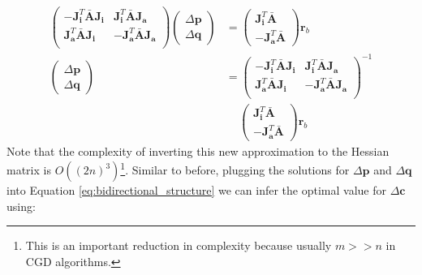\begin{equation}
    \begin{aligned}
        \begin{pmatrix}
            -\mathbf{J}_{\mathbf{i}}^T \bar{\mathbf{A}}\mathbf{J}_{\mathbf{i}} & \mathbf{J}_{\mathbf{i}}^T \bar{\mathbf{A}}\mathbf{J}_{\mathbf{a}}
            \\
            \mathbf{J}_{\mathbf{a}}^T \bar{\mathbf{A}}\mathbf{J}_{\mathbf{i}} & -\mathbf{J}_{\mathbf{a}}^T \bar{\mathbf{A}}\mathbf{J}_{\mathbf{a}}
            \\
        \end{pmatrix}
        \begin{pmatrix}
            \Delta\mathbf{p}
            \\
            \Delta\mathbf{q}
        \end{pmatrix} & =
        \begin{pmatrix}
            \mathbf{J}_{\mathbf{i}}^T\bar{\mathbf{A}}
            \\
            -\mathbf{J}_{\mathbf{a}}^T\bar{\mathbf{A}}
        \end{pmatrix} \mathbf{r}_b
       \\
       \begin{pmatrix}
            \Delta\mathbf{p}
            \\
            \Delta\mathbf{q}
        \end{pmatrix} & =
        \begin{pmatrix}
            -\mathbf{J}_{\mathbf{i}}^T \bar{\mathbf{A}}\mathbf{J}_{\mathbf{i}} & \mathbf{J}_{\mathbf{i}}^T \bar{\mathbf{A}}\mathbf{J}_{\mathbf{a}}
            \\
            \mathbf{J}_{\mathbf{a}}^T \bar{\mathbf{A}}\mathbf{J}_{\mathbf{i}} & -\mathbf{J}_{\mathbf{a}}^T \bar{\mathbf{A}}\mathbf{J}_{\mathbf{a}}
            \\
        \end{pmatrix}^{-1}
        \\
        & \quad \,
        \begin{pmatrix}
            \mathbf{J}_{\mathbf{i}}^T\bar{\mathbf{A}}
            \\
            -\mathbf{J}_{\mathbf{a}}^T\bar{\mathbf{A}}
        \end{pmatrix} \mathbf{r}_b
    \label{eq:bidirectional_schur_solution1}
    \end{aligned}
\end{equation}
Note that the complexity of inverting this new approximation to the Hessian matrix is $O((2n)^3)$\footnote{This is an important reduction in complexity because usually $m >> n$ in CGD algorithms.}. Similar to before, plugging the solutions for $\Delta\mathbf{p}$ and $\Delta\mathbf{q}$ into Equation \ref{eq:bidirectional_structure} we can infer the optimal value for $\Delta\mathbf{c}$ using:
